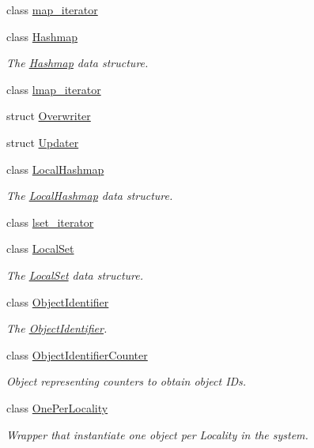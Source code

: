 \begin{DoxyCompactItemize}
\item 
class \hyperlink{classshad_1_1map__iterator}{map\-\_\-iterator}
\item 
class \hyperlink{classshad_1_1Hashmap}{Hashmap}
\begin{DoxyCompactList}\small\item\em The \hyperlink{classshad_1_1Hashmap}{Hashmap} data structure. \end{DoxyCompactList}\item 
class \hyperlink{classshad_1_1lmap__iterator}{lmap\-\_\-iterator}
\item 
struct \hyperlink{structshad_1_1Overwriter}{Overwriter}
\item 
struct \hyperlink{structshad_1_1Updater}{Updater}
\item 
class \hyperlink{classshad_1_1LocalHashmap}{Local\-Hashmap}
\begin{DoxyCompactList}\small\item\em The \hyperlink{classshad_1_1LocalHashmap}{Local\-Hashmap} data structure. \end{DoxyCompactList}\item 
class \hyperlink{classshad_1_1lset__iterator}{lset\-\_\-iterator}
\item 
class \hyperlink{classshad_1_1LocalSet}{Local\-Set}
\begin{DoxyCompactList}\small\item\em The \hyperlink{classshad_1_1LocalSet}{Local\-Set} data structure. \end{DoxyCompactList}\item 
class \hyperlink{classshad_1_1ObjectIdentifier}{Object\-Identifier}
\begin{DoxyCompactList}\small\item\em The \hyperlink{classshad_1_1ObjectIdentifier}{Object\-Identifier}. \end{DoxyCompactList}\item 
class \hyperlink{classshad_1_1ObjectIdentifierCounter}{Object\-Identifier\-Counter}
\begin{DoxyCompactList}\small\item\em Object representing counters to obtain object I\-Ds. \end{DoxyCompactList}\item 
class \hyperlink{classshad_1_1OnePerLocality}{One\-Per\-Locality}
\begin{DoxyCompactList}\small\item\em Wrapper that instantiate one object per Locality in the system. \end{DoxyCompactList}\item 

\end{DoxyCompactItemize}

